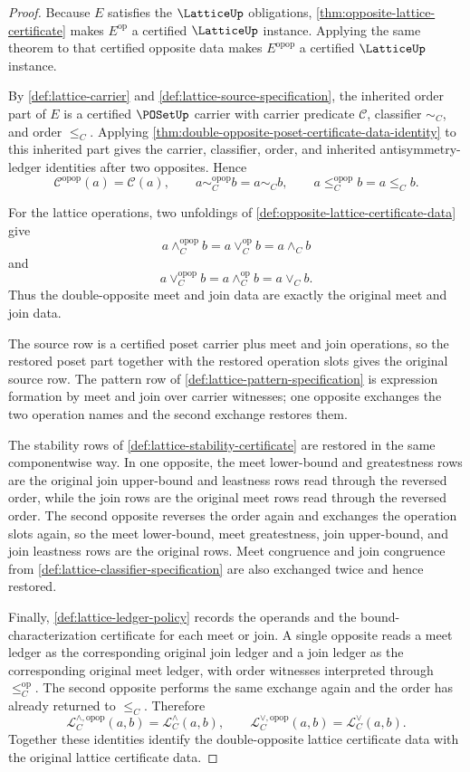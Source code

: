 \begin{proof}
Because $E$ satisfies the $\LatticeUp$ obligations, \autoref{thm:opposite-lattice-certificate} makes $E^{\mathrm{op}}$ a certified $\LatticeUp$ instance. Applying the same theorem to that certified opposite data makes $E^{\mathrm{opop}}$ a certified $\LatticeUp$ instance.

By \autoref{def:lattice-carrier} and \autoref{def:lattice-source-specification}, the inherited order part of $E$ is a certified $\POSetUp$ carrier with carrier predicate $\mathcal C$, classifier $\sim_C$, and order $\le_C$. Applying \autoref{thm:double-opposite-poset-certificate-data-identity} to this inherited part gives the carrier, classifier, order, and inherited antisymmetry-ledger identities after two opposites. Hence
$$
\mathcal C^{\mathrm{opop}}(a)=\mathcal C(a),
\qquad
a\sim_C^{\mathrm{opop}}b=a\sim_C b,
\qquad
a\le_C^{\mathrm{opop}}b=a\le_C b.
$$

For the lattice operations, two unfoldings of \autoref{def:opposite-lattice-certificate-data} give
$$
a\wedge_C^{\mathrm{opop}} b
= a\vee_C^{\mathrm{op}} b
= a\wedge_C b
$$
and
$$
a\vee_C^{\mathrm{opop}} b
= a\wedge_C^{\mathrm{op}} b
= a\vee_C b.
$$
Thus the double-opposite meet and join data are exactly the original meet and join data.

The source row is a certified poset carrier plus meet and join operations, so the restored poset part together with the restored operation slots gives the original source row. The pattern row of \autoref{def:lattice-pattern-specification} is expression formation by meet and join over carrier witnesses; one opposite exchanges the two operation names and the second exchange restores them.

The stability rows of \autoref{def:lattice-stability-certificate} are restored in the same componentwise way. In one opposite, the meet lower-bound and greatestness rows are the original join upper-bound and leastness rows read through the reversed order, while the join rows are the original meet rows read through the reversed order. The second opposite reverses the order again and exchanges the operation slots again, so the meet lower-bound, meet greatestness, join upper-bound, and join leastness rows are the original rows. Meet congruence and join congruence from \autoref{def:lattice-classifier-specification} are also exchanged twice and hence restored.

Finally, \autoref{def:lattice-ledger-policy} records the operands and the bound-characterization certificate for each meet or join. A single opposite reads a meet ledger as the corresponding original join ledger and a join ledger as the corresponding original meet ledger, with order witnesses interpreted through $\le_C^{\mathrm{op}}$. The second opposite performs the same exchange again and the order has already returned to $\le_C$. Therefore
$$
\mathcal L_C^{\wedge,\mathrm{opop}}(a,b)=\mathcal L_C^{\wedge}(a,b),
\qquad
\mathcal L_C^{\vee,\mathrm{opop}}(a,b)=\mathcal L_C^{\vee}(a,b).
$$
Together these identities identify the double-opposite lattice certificate data with the original lattice certificate data.
\end{proof}


